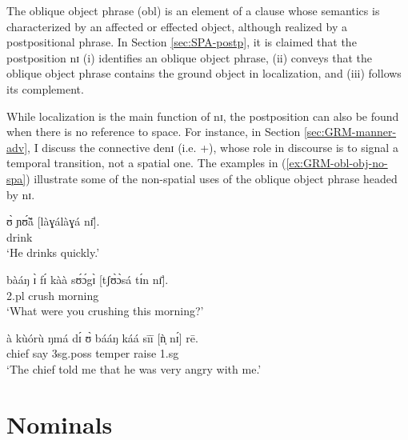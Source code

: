 \begin{exe}
\begin{exe}
\begin{exe}
{The oblique object phrase ({\sc obl}) is an element of a clause whose  
semantics is
characterized by an  affected or effected object, although realized by a
postpositional phrase.  In Section \ref{sec:SPA-postp},  it is claimed that the
postposition {\sls nɪ} (i) identifies an oblique object phrase, (ii) conveys 
that
the oblique object phrase contains the ground object in localization, and
(iii) follows its complement. 

While localization is
the main function of  {\sls nɪ}, the postposition can also be found when there
is no  reference to space. For instance, in Section \ref{sec:GRM-manner-adv}, I
discuss the connective {\sls denɪ} (i.e. {\dem}+{\postp}), whose role in
discourse is to signal a temporal transition, not a spatial one.  The
examples in (\ref{ex:GRM-obl-obj-no-spa}) illustrate some of the non-spatial
uses
of the oblique object phrase headed by {\sls nɪ}.


\ea\label{ex:GRM-obl-obj-no-spa}

\ea
\gll ʊ̀ ɲʊ̃́ã́  [làɣálàɣá nɪ̄].\\
   {\psg} drink {\advm} {\postp}\\
\glt  `He drinks quickly.' 

\ex
\gll bàáŋ ɪ̀ fɪ́ kàà sʊ́ɔ́gɪ̀ [tʃʊ̀ɔ̀sá tɪ́n nɪ̄].\\
 {\q} {\sc 2.pl} {\pst} {\egr} crush  morning {\art} {\postp}\\
\glt  `What were you crushing this morning?' 

\ex\label{ex:GRM-obl-obj-no-spa-foc}
\gll à kùórù ŋmá dɪ́ ʊ̀ bááŋ káá sīī [ǹ̩ nɪ́] rē.\\
{\art} chief say {\comp} {\sc 3sg.poss} temper {\egr} raise {\sc 1.sg} {\postp}
{\foc}\\
\glt  `The chief told me that he was very angry with me.' 


\z 
 \z

 



% 




\section{Nominals}
\label{sec:GRM-nom}


}
\end{exe}
\end{exe}
\end{exe}
